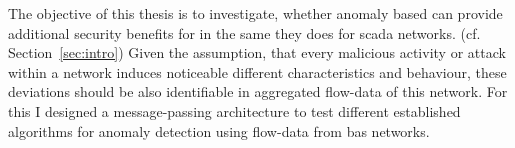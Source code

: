 
\begin{comment}
\begin{itemize}
	\item experiment
	\item test data captured from a floor section of the computer science building
	\item enriched with malicious packets to keep consistent
	
	\item (focusses only an purpose based) attack classes (cf. \parencite{Uma2013})
		\subitem \gls{dos}
			\subsubitem Short circuit -> blackout on entire line
			\subsubitem flooding of \code{A\_Restart} telegrams
			\subsubitem flooding nonsense
		\subitem replay
			\subsubitem repeating a time window
			\subsubitem sniff a tag and repeat it compressed??? \alert{whatever this means?}
			\subsubitem do inverse action
		\subitem manipulation/reconfiguration
			\subsubitem telegram manipulation
			\subsubitem reconfiguration of devices (Access Attack)
			\subsubitem reconfigure line couplers/make them useless (Access Attack)
		\subitem spoofing 
		\subitem Reconnaissance Attack
			\subsubitem network mapping
			
		\subitem 
	
	\item aim is to show if attacks can be identified by anomaly detection on flow data
		\subitem under the assumption, that attacks noticeable alter the characteristic and behaviour of \gls{knx} traffic
		\subitem cf. \parencite{Mukherjee1994,Yang2006,Pan2014}
	\item demonstrate a message-passing architecture to perform online analytics on \gls{knx} flow-data
	\item benchmark different algorithms against each other
\end{itemize}
\end{comment}

The objective of this thesis is to investigate, whether anomaly based  can provide additional security benefits for  in the same they does for \gls{scada} networks. (cf. Section~\ref{sec:intro})
Given the assumption, that every malicious activity or attack within a network induces noticeable different characteristics and behaviour, these deviations should be also identifiable in aggregated flow-data of this network. \parencite[cf.][]{Mukherjee1994,Yang2006,Pan2014}
For this I designed a message-passing architecture to test different established algorithms for anomaly detection using flow-data from \gls{bas} networks.


